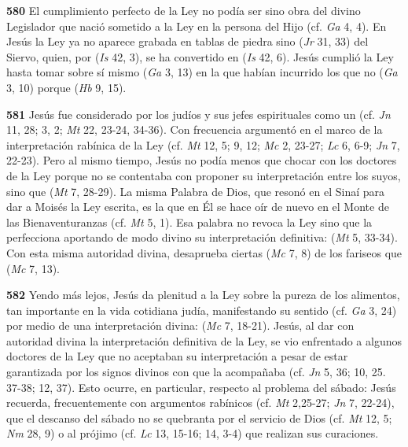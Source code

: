 \begin{body}
\begin{body}
\textbf{580} El cumplimiento perfecto de la Ley no podía ser sino obra del divino Legislador que nació sometido a la Ley en la persona del Hijo (cf. \emph{Ga} 4, 4). En Jesús la Ley ya no aparece grabada en tablas de piedra sino  (\emph{Jr} 31, 33) del Siervo, quien, por  (\emph{Is} 42, 3), se ha convertido en  (\emph{Is} 42, 6). Jesús cumplió la Ley hasta tomar sobre sí mismo  (\emph{Ga} 3, 13) en la que habían incurrido los que no  (\emph{Ga} 3, 10) porque  (\emph{Hb} 9, 15).

\textbf{581} Jesús fue considerado por los judíos y sus jefes espirituales como un  (cf. \emph{Jn} 11, 28; 3, 2; \emph{Mt} 22, 23-24, 34-36). Con frecuencia argumentó en el marco de la interpretación rabínica de la Ley (cf. \emph{Mt} 12, 5; 9, 12; \emph{Mc} 2, 23-27; \emph{Lc} 6, 6-9; \emph{Jn} 7, 22-23). Pero al mismo tiempo, Jesús no podía menos que chocar con los doctores de la Ley porque no se contentaba con proponer su interpretación entre los suyos, sino que  (\emph{Mt} 7, 28-29). La misma Palabra de Dios, que resonó en el Sinaí para dar a Moisés la Ley escrita, es la que en Él se hace oír de nuevo en el Monte de las Bienaventuranzas (cf. \emph{Mt} 5, 1). Esa palabra no revoca la Ley sino que la perfecciona aportando de modo divino su interpretación definitiva:  (\emph{Mt} 5, 33-34). Con esta misma autoridad divina, desaprueba ciertas  (\emph{Mc} 7, 8) de los fariseos que  (\emph{Mc} 7, 13).

\textbf{582} Yendo más lejos, Jesús da plenitud a la Ley sobre la pureza de los alimentos, tan importante en la vida cotidiana judía, manifestando su sentido  (cf. \emph{Ga} 3, 24) por medio de una interpretación divina:  (\emph{Mc} 7, 18-21). Jesús, al dar con autoridad divina la interpretación definitiva de la Ley, se vio enfrentado a algunos doctores de la Ley que no aceptaban su interpretación a pesar de estar garantizada por los signos divinos con que la acompañaba (cf. \emph{Jn} 5, 36; 10, 25. 37-38; 12, 37). Esto ocurre, en particular, respecto al problema del sábado: Jesús recuerda, frecuentemente con argumentos rabínicos (cf. \emph{Mt} 2,25-27; \emph{Jn} 7, 22-24), que el descanso del sábado no se quebranta por el servicio de Dios (cf. \emph{Mt} 12, 5; \emph{Nm} 28, 9) o al prójimo (cf. \emph{Lc} 13, 15-16; 14, 3-4) que realizan sus curaciones.


\end{body}
\end{body}
